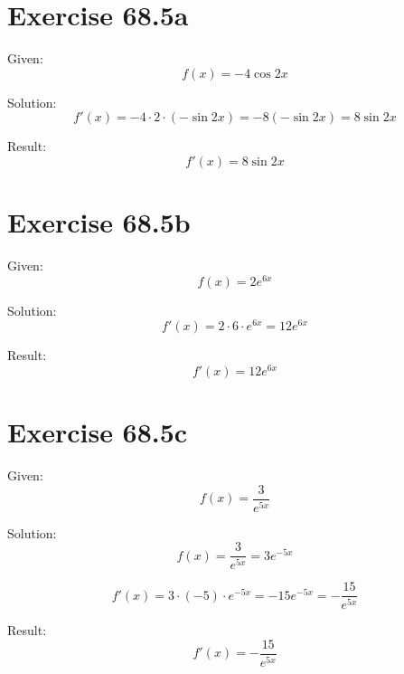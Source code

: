 \documentclass[a4paper, 10pt]{scrartcl}
\begin{document}
\section{Exercise 68.5a}

Given:
\[f(x) = -4\cos{2x}\]

Solution:
\[f'(x) = -4\cdot2\cdot(-\sin{2x}) = -8(-\sin{2x}) = 8\sin{2x}\]

Result:
\[f'(x) = 8\sin{2x}\]

\section{Exercise 68.5b}

Given:
\[f(x) = 2e^{6x}\]

Solution:
\[f'(x) = 2\cdot6\cdot e^{6x} = 12e^{6x}\]

Result:
\[f'(x) = 12e^{6x}\]

\section{Exercise 68.5c}

Given:
\[f(x) = \frac{3}{e^{5x}}\]

Solution:
\[f(x) = \frac{3}{e^{5x}} = 3e^{-5x}\]

\[f'(x) = 3\cdot(-5)\cdot e^{-5x} = -15e^{-5x} = -\frac{15}{e^{5x}}\]

Result:
\[f'(x) = -\frac{15}{e^{5x}}\]
\end{document}
